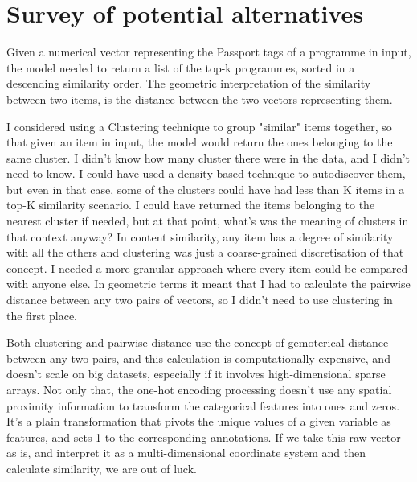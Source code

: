 
\section{Survey of potential alternatives}

Given a numerical vector representing the Passport tags of a programme in input, the model needed to return a list of the top-k programmes,
sorted in a descending similarity order.
The geometric interpretation of the similarity between two items, is the distance between the two vectors representing them.

I considered using a Clustering technique to group "similar" items together, so that given an item in input, the model would return
the ones belonging to the same cluster. I didn't know how many cluster there were in the data, and I didn't need to know.
I could have used a density-based technique to autodiscover them,
but even in that case, some of the clusters could have had less than K items in a top-K similarity scenario.
I could have returned the items belonging to the nearest cluster if needed, but at that point,
what's was the meaning of clusters in that context anyway?
In content similarity, any item has a degree of similarity with
all the others and clustering was just a coarse-grained discretisation of that concept.
I needed a more granular approach where every item could be compared with anyone else.
In geometric terms it meant that I had to calculate the pairwise distance between any two pairs of vectors, so I didn't need to use
clustering in the first place.

Both clustering and pairwise distance use the concept of gemoterical distance between any two pairs, and this calculation
is computationally expensive, and doesn't scale on big datasets, especially if it involves high-dimensional sparse arrays.
Not only that, the one-hot encoding processing doesn't use any spatial proximity information to transform the categorical features
into ones and zeros. It's a plain transformation that pivots the unique values of a given variable as features, and sets 1 to the
corresponding annotations. If we take this raw vector as is, and interpret it as a multi-dimensional coordinate system and then calculate
similarity, we are out of luck.

